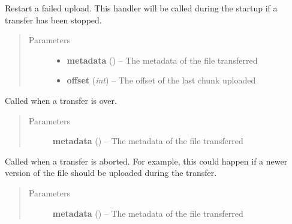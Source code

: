 \documentclass[letterpaper,10pt,english]{sphinxmanual}
\begin{document}
\begin{fulllineitems}
\label{drivers:restart_upload}
Restart a failed upload. This handler will be called during the startup if a transfer has been stopped.
\begin{quote}\begin{description}
\item[{Parameters}] \leavevmode\begin{itemize}
\item {} 
\textbf{metadata} ({\hyperref[drivers:onitu.api.metadata.Metadata]{}}) -- The metadata of the file transferred

\item {} 
\textbf{offset} (\emph{int}) -- The offset of the last chunk uploaded

\end{itemize}

\end{description}\end{quote}

\end{fulllineitems}


\begin{fulllineitems}
\label{drivers:end_upload}
Called when a transfer is over.
\begin{quote}\begin{description}
\item[{Parameters}] \leavevmode
\textbf{metadata} ({\hyperref[drivers:onitu.api.metadata.Metadata]{}}) -- The metadata of the file transferred

\end{description}\end{quote}

\end{fulllineitems}


\begin{fulllineitems}
\label{drivers:abort_upload}
Called when a transfer is aborted. For example, this could happen if a newer version of the file should be uploaded during the transfer.
\begin{quote}\begin{description}
\item[{Parameters}] \leavevmode
\textbf{metadata} ({\hyperref[drivers:onitu.api.metadata.Metadata]{}}) -- The metadata of the file transferred

\end{description}\end{quote}

\end{fulllineitems}
\end{document}
